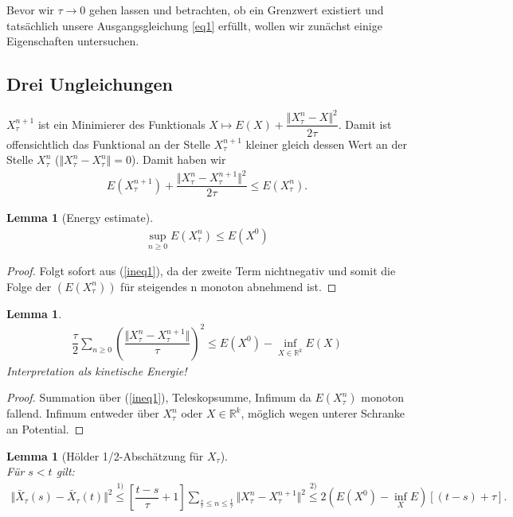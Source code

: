 \documentclass[11pt,a4paper,notitlepage]{scrreprt}
\newcommand{\RR}{\mathbb{R}}
\newtheorem{lem}[defi]{Lemma}
\begin{document}
Bevor wir $\tau \to 0$ gehen lassen und betrachten, ob ein Grenzwert existiert und tatsächlich unsere Ausgangsgleichung \ref{eq1} erfüllt, wollen wir zunächst einige Eigenschaften untersuchen. 

\subsection{Drei Ungleichungen}



$X_\tau^{n+1}$ ist ein Minimierer des Funktionals $X \mapsto E(X)+\dfrac{\Vert X_\tau^n-X\Vert^2}{2\tau}$. Damit ist offensichtlich das Funktional an der Stelle $X_\tau^{n+1}$ kleiner gleich dessen Wert an der Stelle $X_\tau^n$ ($\Vert X_\tau^n-X_\tau^n\Vert=0$). Damit haben wir
\begin{eqnarray}
E(X_\tau^{n+1})+\dfrac{\Vert X_\tau^n-X_\tau^{n+1}\Vert^2}{2\tau}\leq E(X_\tau^n). \label{ineq1}
\end{eqnarray} 
\begin{lem}[Energy estimate]
\begin{eqnarray}
\sup_{n\geq 0}E(X_\tau^n)\leq E(X^0) \label{enest}
\end{eqnarray}
\end{lem}
\begin{proof}
Folgt sofort aus (\ref{ineq1}), da der zweite Term nichtnegativ und somit die Folge der $(E(X_\tau^n))$ für steigendes n monoton abnehmend ist. 
\end{proof}

\begin{lem}
\begin{eqnarray}
\dfrac{\tau}{2}\sum_{n\geq 0} \left(\dfrac{\Vert X_\tau^n-X_\tau^{n+1}\Vert}{\tau}\right)^2\leq E(X^0)-\inf_{X\in\RR^k} E(X)\label{totalsquare}
\end{eqnarray}
Interpretation als kinetische Energie!
\end{lem}
\begin{proof}
Summation über (\ref{ineq1}), Teleskopsumme, Infimum da $E(X_\tau^n)$ monoton fallend. Infimum entweder über $X_\tau^n$ oder $X\in\RR^k$, möglich wegen unterer Schranke an Potential. 
\end{proof}

\begin{lem}[Hölder 1/2-Abschätzung für $X_\tau$]  $~~$ \\
Für $s<t$ gilt:
\begin{eqnarray}
\Vert \bar{X}_\tau(s)-\bar{X}_\tau(t)\Vert^2 \overset{1)}\leq \left[\dfrac{t-s}{\tau}+1\right] \sum_{\frac{s}{\tau}\leq n \leq \frac{t}{\tau}} \Vert X^n_\tau- X_\tau^{n+1}\Vert^2 \overset{2)}\leq 2(E(X^0)-\inf_X E)[(t-s)+\tau]. \label{Hölder}
\end{eqnarray}
\end{lem}
\end{document}
